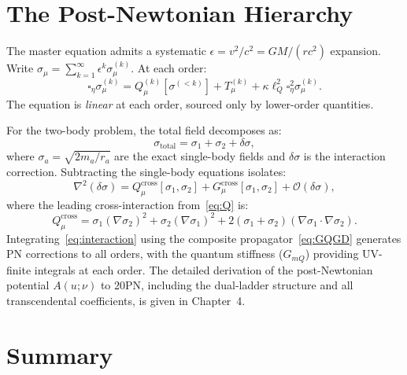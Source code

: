 \documentclass[11pt,a4paper]{article}
\theoremstyle{plain}
\theoremstyle{definition}
\theoremstyle{remark}
\newcommand{\lQ}{\ell_Q}
\begin{document}
\section{The Post-Newtonian Hierarchy}
\label{sec:pn}

The master equation admits a systematic $\epsilon = v^2/c^2 = GM/(rc^2)$ expansion.
Write $\sigma_\mu = \sum_{k=1}^\infty\epsilon^k\sigma_\mu^{(k)}$.  At each order:
\begin{equation}
  \square_\eta\sigma_\mu^{(k)}
  = Q_\mu^{(k)}[\sigma^{(<k)}] + T_\mu^{(k)} + \kappa\lQ^2\square_\eta^2\sigma_\mu^{(k)}.
  \label{eq:pn_hierarchy}
\end{equation}
The equation is \emph{linear} at each order, sourced only by lower-order quantities.

For the two-body problem, the total field decomposes as:
\[
  \sigma_{\mathrm{total}} = \sigma_1 + \sigma_2 + \delta\sigma,
\]
where $\sigma_a = \sqrt{2m_a/r_a}$ are the exact single-body fields and $\delta\sigma$
is the interaction correction.  Subtracting the single-body equations isolates:
\begin{equation}
  \nabla^2(\delta\sigma)
  = Q_\mu^{\mathrm{cross}}[\sigma_1,\sigma_2]
    + G_\mu^{\mathrm{cross}}[\sigma_1,\sigma_2]
    + \mathcal{O}(\delta\sigma),
  \label{eq:interaction}
\end{equation}
where the leading cross-interaction from~\eqref{eq:Q} is:
\begin{equation}
  Q_\mu^{\mathrm{cross}}
  = \sigma_1(\nabla\sigma_2)^2 + \sigma_2(\nabla\sigma_1)^2
    + 2(\sigma_1+\sigma_2)(\nabla\sigma_1\cdot\nabla\sigma_2).
  \label{eq:Qcross}
\end{equation}
Integrating~\eqref{eq:interaction} using the composite propagator~\eqref{eq:GQGD}
generates PN corrections to all orders, with the quantum stiffness ($G_{mQ}$) providing
UV-finite integrals at each order.  The detailed derivation of the post-Newtonian
potential $A(u;\nu)$ to 20PN, including the dual-ladder structure and all
transcendental coefficients, is given in Chapter~4.

\section{Summary}
\label{sec:summary}
\end{document}
